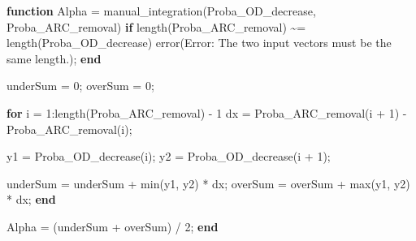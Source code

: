 \documentclass[
  letterpaper,
  DIV=11,
  numbers=noendperiod]{scrartcl}
\newenvironment{Shaded}{\begin{snugshade}}{\end{snugshade}}
\newcommand{\FloatTok}[1]{\textcolor[rgb]{0.68,0.00,0.00}{#1}}
\newcommand{\KeywordTok}[1]{\textcolor[rgb]{0.00,0.23,0.31}{\textbf{#1}}}
\newcommand{\NormalTok}[1]{\textcolor[rgb]{0.00,0.23,0.31}{#1}}
\newcommand{\OperatorTok}[1]{\textcolor[rgb]{0.37,0.37,0.37}{#1}}
\newcommand{\SpecialStringTok}[1]{\textcolor[rgb]{0.13,0.47,0.30}{#1}}
\newcommand{\VariableTok}[1]{\textcolor[rgb]{0.07,0.07,0.07}{#1}}
\begin{document}
\begin{Shaded}
\begin{Highlighting}[]
\KeywordTok{function} \VariableTok{Alpha} \OperatorTok{=} \VariableTok{manual\_integration}\NormalTok{(}\VariableTok{Proba\_OD\_decrease}\OperatorTok{,} \VariableTok{Proba\_ARC\_removal}\NormalTok{)}
    \KeywordTok{if} \VariableTok{length}\NormalTok{(}\VariableTok{Proba\_ARC\_removal}\NormalTok{) }\OperatorTok{\textasciitilde{}=} \VariableTok{length}\NormalTok{(}\VariableTok{Proba\_OD\_decrease}\NormalTok{)}
        \VariableTok{error}\NormalTok{(}\SpecialStringTok{\textquotesingle{}Error: The two input vectors must be the same length.\textquotesingle{}}\NormalTok{)}\OperatorTok{;}
    \KeywordTok{end}

    \VariableTok{underSum} \OperatorTok{=} \FloatTok{0}\OperatorTok{;}
    \VariableTok{overSum}  \OperatorTok{=} \FloatTok{0}\OperatorTok{;}

    \KeywordTok{for} \VariableTok{i} \OperatorTok{=} \FloatTok{1}\OperatorTok{:}\VariableTok{length}\NormalTok{(}\VariableTok{Proba\_ARC\_removal}\NormalTok{) }\OperatorTok{{-}} \FloatTok{1}
        \VariableTok{dx} \OperatorTok{=} \VariableTok{Proba\_ARC\_removal}\NormalTok{(}\VariableTok{i} \OperatorTok{+} \FloatTok{1}\NormalTok{) }\OperatorTok{{-}} \VariableTok{Proba\_ARC\_removal}\NormalTok{(}\VariableTok{i}\NormalTok{)}\OperatorTok{;}

        \VariableTok{y1} \OperatorTok{=} \VariableTok{Proba\_OD\_decrease}\NormalTok{(}\VariableTok{i}\NormalTok{)}\OperatorTok{;}
        \VariableTok{y2} \OperatorTok{=} \VariableTok{Proba\_OD\_decrease}\NormalTok{(}\VariableTok{i} \OperatorTok{+} \FloatTok{1}\NormalTok{)}\OperatorTok{;}

        \VariableTok{underSum} \OperatorTok{=} \VariableTok{underSum} \OperatorTok{+} \VariableTok{min}\NormalTok{(}\VariableTok{y1}\OperatorTok{,} \VariableTok{y2}\NormalTok{) }\OperatorTok{*} \VariableTok{dx}\OperatorTok{;}
        \VariableTok{overSum}  \OperatorTok{=} \VariableTok{overSum}  \OperatorTok{+} \VariableTok{max}\NormalTok{(}\VariableTok{y1}\OperatorTok{,} \VariableTok{y2}\NormalTok{) }\OperatorTok{*} \VariableTok{dx}\OperatorTok{;}
    \KeywordTok{end}

    \VariableTok{Alpha} \OperatorTok{=}\NormalTok{ (}\VariableTok{underSum} \OperatorTok{+} \VariableTok{overSum}\NormalTok{) }\OperatorTok{/} \FloatTok{2}\OperatorTok{;}
\KeywordTok{end}
\end{Highlighting}
\end{Shaded}
\end{document}
